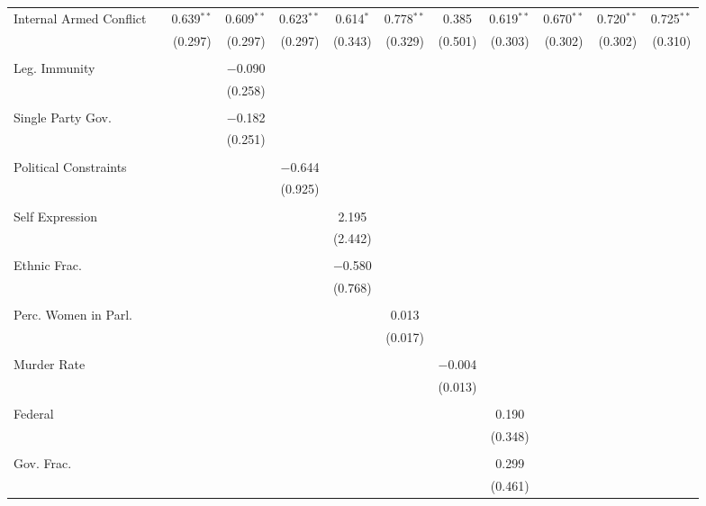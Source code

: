 \documentclass[a4paper]{article}\usepackage[]{graphicx}\usepackage[]{color}
\begin{document}
\begin{table}
\begin{center}
{{\begin{tabular}{@{\extracolsep{5pt}}lccccccccccc}
 Internal Armed Conflict &  & 0.639$^{**}$ & 0.609$^{**}$ & 0.623$^{**}$ & 0.614$^{*}$ & 0.778$^{**}$ & 0.385 & 0.619$^{**}$ & 0.670$^{**}$ & 0.720$^{**}$ & 0.725$^{**}$ \\ 
  &  & (0.297) & (0.297) & (0.297) & (0.343) & (0.329) & (0.501) & (0.303) & (0.302) & (0.302) & (0.310) \\ 
  & & & & & & & & & & & \\ 
 Leg. Immunity &  &  & $-$0.090 &  &  &  &  &  &  &  &  \\ 
  &  &  & (0.258) &  &  &  &  &  &  &  &  \\ 
  & & & & & & & & & & & \\ 
 Single Party Gov. &  &  & $-$0.182 &  &  &  &  &  &  &  &  \\ 
  &  &  & (0.251) &  &  &  &  &  &  &  &  \\ 
  & & & & & & & & & & & \\ 
 Political Constraints &  &  &  & $-$0.644 &  &  &  &  &  &  &  \\ 
  &  &  &  & (0.925) &  &  &  &  &  &  &  \\ 
  & & & & & & & & & & & \\ 
 Self Expression &  &  &  &  & 2.195 &  &  &  &  &  &  \\ 
  &  &  &  &  & (2.442) &  &  &  &  &  &  \\ 
  & & & & & & & & & & & \\ 
 Ethnic Frac. &  &  &  &  & $-$0.580 &  &  &  &  &  &  \\ 
  &  &  &  &  & (0.768) &  &  &  &  &  &  \\ 
  & & & & & & & & & & & \\ 
 Perc. Women in Parl. &  &  &  &  &  & 0.013 &  &  &  &  &  \\ 
  &  &  &  &  &  & (0.017) &  &  &  &  &  \\ 
  & & & & & & & & & & & \\ 
 Murder Rate &  &  &  &  &  &  & $-$0.004 &  &  &  &  \\ 
  &  &  &  &  &  &  & (0.013) &  &  &  &  \\ 
  & & & & & & & & & & & \\ 
 Federal &  &  &  &  &  &  &  & 0.190 &  &  &  \\ 
  &  &  &  &  &  &  &  & (0.348) &  &  &  \\ 
  & & & & & & & & & & & \\ 
 Gov. Frac. &  &  &  &  &  &  &  & 0.299 &  &  &  \\ 
  &  &  &  &  &  &  &  & (0.461) &  &  &  \\ 

\end{tabular}}}
\end{center}
\end{table}
\end{document}
